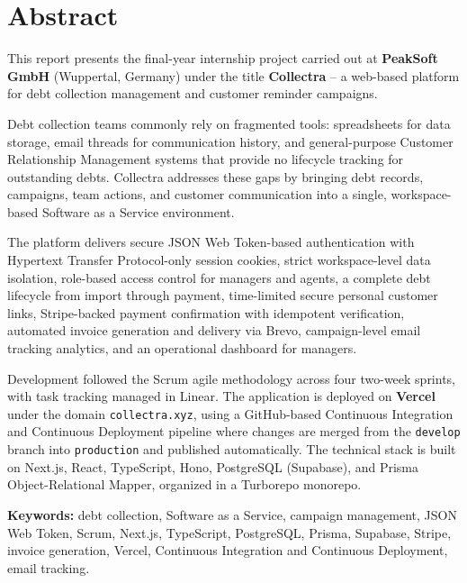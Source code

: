\documentclass[12pt,a4paper]{report}
\begin{document}
\clearpage


\chapter*{Abstract}
{}

This report presents the final-year internship project carried out at
\textbf{PeakSoft GmbH} (Wuppertal, Germany) under the title \textbf{Collectra} --
a web-based platform for debt collection management and customer reminder campaigns.

Debt collection teams commonly rely on fragmented tools: spreadsheets for data
storage, email threads for communication history, and general-purpose Customer Relationship Management systems
that provide no lifecycle tracking for outstanding debts.
Collectra addresses these gaps by bringing debt records, campaigns, team actions,
and customer communication into a single, workspace-based Software as a Service environment.

The platform delivers secure JSON Web Token-based authentication with Hypertext Transfer Protocol-only
session cookies,
strict workspace-level data isolation, role-based access control for managers and
agents, a complete debt lifecycle from import through payment, time-limited secure
personal customer links, Stripe-backed payment confirmation with idempotent
verification, automated invoice generation and delivery via Brevo, campaign-level
email tracking analytics, and an operational dashboard for managers.

Development followed the Scrum agile methodology across four two-week sprints, with
task tracking managed in Linear.
The application is deployed on \textbf{Vercel} under the domain
\texttt{collectra.xyz}, using a GitHub-based Continuous Integration and Continuous Deployment pipeline where changes are
merged from the \texttt{develop} branch into \texttt{production} and published
automatically.
The technical stack is built on Next.js, React, TypeScript, Hono, PostgreSQL
(Supabase), and Prisma Object-Relational Mapper, organized in a Turborepo monorepo.

\medskip
\noindent{\color{accentblue}\rule{2.8cm}{0.55pt}}\par\vspace{0.35em}
\noindent\textbf{Keywords:}
debt collection, Software as a Service, campaign management, JSON Web Token, Scrum, Next.js,
TypeScript, PostgreSQL, Prisma, Supabase, Stripe, invoice generation, Vercel,
Continuous Integration and Continuous Deployment, email tracking.
\end{document}
